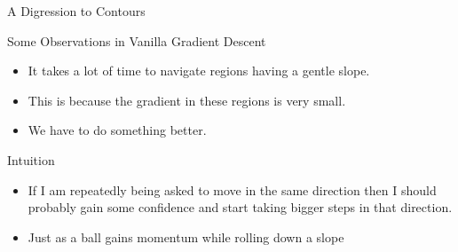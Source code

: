 \documentclass[10pt, aspectratio=169]{beamer}
\begin{document}
\begin{frame}{A Digression to Contours}
\end{frame}


\begin{frame}
\begin{block}{Some Observations in Vanilla Gradient Descent}
\begin{itemize}
\item<1-> It takes a lot of time to navigate regions having a gentle slope.
\item<2-> This is because the gradient in these regions is very small.
\item<3-> We have to do something better.
\end{itemize}
\end{block}
\end{frame}



\begin{frame}
\begin{block}{Intuition}

\begin{itemize}
\item<1-> If I am repeatedly being asked to move in the same direction then I should probably gain some confidence and start taking bigger steps in that direction.
\item<2-> Just as a ball gains momentum while rolling down a slope
\end{itemize}
\end{block}
\end{frame}
\end{document}
